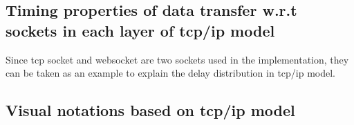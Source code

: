 \subsection{Timing properties of data transfer w.r.t sockets in each layer of \gls{tcp/ip} model}
Since \gls{tcp} socket and websocket are two sockets used in the implementation, 
they can be taken as an example to explain the delay distribution in \gls{tcp/ip} model.




\subsection{Visual notations based on \gls{tcp/ip} model}
